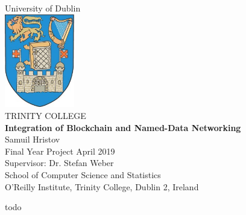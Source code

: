\documentclass[a4paper, 12pt, oneside]{report}         %
\begin{document}
\begin{titlepage}
\begin{center}
\huge{University of Dublin}\\[2.5mm]
\includegraphics[width=1.2in]{trinity.jpg}\\
\Huge{TRINITY COLLEGE} \\
\vspace{1in}
\Large\textbf{Integration of Blockchain and Named-Data Networking}\\
\vspace{0.5in}
Samuil Hristov\\
Final Year Project April 2019\\
Supervisor: Dr. Stefan Weber\\
\vfill
School of Computer Science and Statistics\\
O'Reilly Institute, Trinity College, Dublin 2, Ireland\\
\end{center}
\end{titlepage}
\thesisdeclarationpage				  %

\thesispermissionpage				  %


\begin{thesisacknowledgments}                     %
 todo
\end{thesisacknowledgments}                       %
\end{document}
